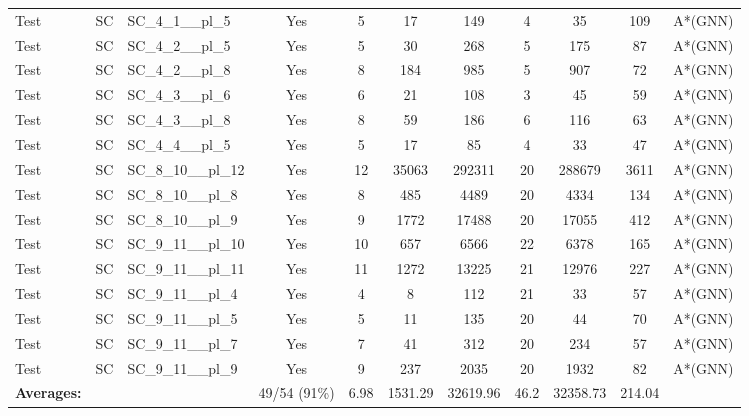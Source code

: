 \documentclass{article}
\begin{document}
\begin{tabular}{lllcccccccc}
Test & SC & SC\_4\_1\_\_pl\_5 & Yes & 5 & 17 & 149 & 4 & 35 & 109 & A*(GNN) \\
Test & SC & SC\_4\_2\_\_pl\_5 & Yes & 5 & 30 & 268 & 5 & 175 & 87 & A*(GNN) \\
Test & SC & SC\_4\_2\_\_pl\_8 & Yes & 8 & 184 & 985 & 5 & 907 & 72 & A*(GNN) \\
Test & SC & SC\_4\_3\_\_pl\_6 & Yes & 6 & 21 & 108 & 3 & 45 & 59 & A*(GNN) \\
Test & SC & SC\_4\_3\_\_pl\_8 & Yes & 8 & 59 & 186 & 6 & 116 & 63 & A*(GNN) \\
Test & SC & SC\_4\_4\_\_pl\_5 & Yes & 5 & 17 & 85 & 4 & 33 & 47 & A*(GNN) \\
Test & SC & SC\_8\_10\_\_pl\_12 & Yes & 12 & 35063 & 292311 & 20 & 288679 & 3611 & A*(GNN) \\
Test & SC & SC\_8\_10\_\_pl\_8 & Yes & 8 & 485 & 4489 & 20 & 4334 & 134 & A*(GNN) \\
Test & SC & SC\_8\_10\_\_pl\_9 & Yes & 9 & 1772 & 17488 & 20 & 17055 & 412 & A*(GNN) \\
Test & SC & SC\_9\_11\_\_pl\_10 & Yes & 10 & 657 & 6566 & 22 & 6378 & 165 & A*(GNN) \\
Test & SC & SC\_9\_11\_\_pl\_11 & Yes & 11 & 1272 & 13225 & 21 & 12976 & 227 & A*(GNN) \\
Test & SC & SC\_9\_11\_\_pl\_4 & Yes & 4 & 8 & 112 & 21 & 33 & 57 & A*(GNN) \\
Test & SC & SC\_9\_11\_\_pl\_5 & Yes & 5 & 11 & 135 & 20 & 44 & 70 & A*(GNN) \\
Test & SC & SC\_9\_11\_\_pl\_7 & Yes & 7 & 41 & 312 & 20 & 234 & 57 & A*(GNN) \\
Test & SC & SC\_9\_11\_\_pl\_9 & Yes & 9 & 237 & 2035 & 20 & 1932 & 82 & A*(GNN) \\
\textbf{Averages:} & & & 49/54 (91\%) & 6.98 & 1531.29 & 32619.96 & 46.2 & 32358.73 & 214.04 & \\
\bottomrule
\end{tabular}
\newpage
\end{document}
